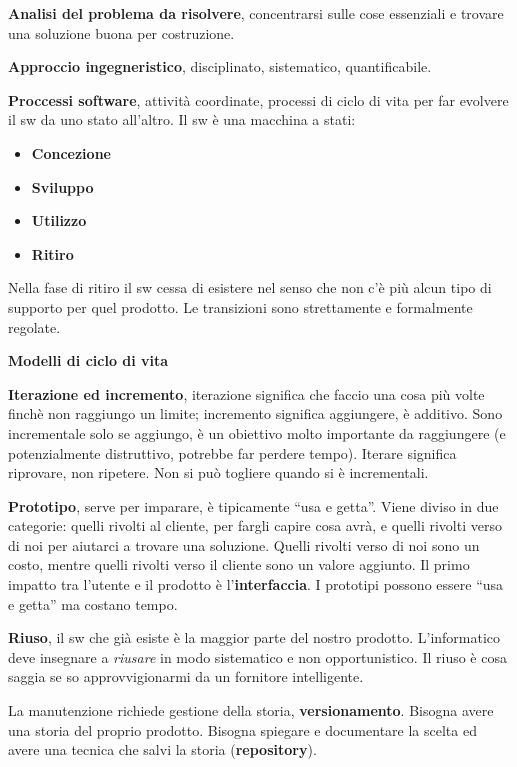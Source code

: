 \textbf{Analisi del problema da risolvere}, concentrarsi sulle cose essenziali e trovare una soluzione buona per costruzione.

\textbf{Approccio ingegneristico}, disciplinato, sistematico, quantificabile.

\textbf{Proccessi software}, attività coordinate, processi di ciclo di vita per far evolvere il sw da uno stato all'altro. Il sw è una macchina a stati:

\begin{itemize}

	\item \textbf{Concezione}
	\item \textbf{Sviluppo}
	\item \textbf{Utilizzo}
	\item \textbf{Ritiro}

\end{itemize}

Nella fase di ritiro il sw cessa di esistere nel senso che non c'è più alcun tipo di supporto per quel prodotto. Le transizioni sono strettamente e formalmente regolate.

\textbf{Modelli di ciclo di vita}

\textbf{Iterazione ed incremento}, iterazione significa che faccio una cosa più volte finchè non raggiungo un limite; incremento significa aggiungere, è additivo. Sono incrementale solo se aggiungo, è  un obiettivo molto importante da raggiungere (e potenzialmente distruttivo, potrebbe far perdere tempo). Iterare significa riprovare, non ripetere. Non si può togliere quando si è incrementali.

\textbf{Prototipo}, serve per imparare, è tipicamente “usa e getta”. Viene diviso in due categorie: quelli rivolti al cliente, per fargli capire cosa avrà, e quelli rivolti verso di noi per aiutarci a trovare una soluzione. Quelli rivolti verso di noi sono un costo, mentre quelli rivolti verso il cliente sono un valore aggiunto. Il primo impatto tra l'utente e il prodotto è l'\textbf{interfaccia}. I prototipi possono essere “usa e getta” ma costano tempo.

\textbf{Riuso}, il sw che già esiste è la maggior parte del nostro prodotto. L'informatico deve insegnare a \textit{riusare} in modo sistematico e non opportunistico. Il riuso è cosa saggia se so approvvigionarmi da un fornitore intelligente.

La manutenzione richiede gestione della storia, \textbf{versionamento}. Bisogna avere una storia del proprio prodotto. Bisogna spiegare e documentare la scelta ed avere una tecnica che salvi la storia (\textbf{repository}).


